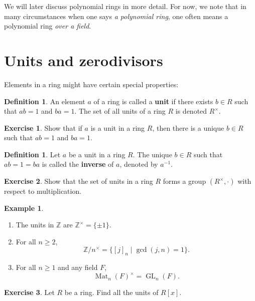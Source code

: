 \documentclass[12pt]{report}
\numberwithin{equation}{section}
\numberwithin{theorem}{chapter}
\theoremstyle{definition}
\newtheorem{definition}[theorem]{Definition}
\newtheorem{example}[theorem]{Example}
\newtheorem{exercise}{Exercise}
\newtheorem*{basic properties}{Basic Properties}
\newtheorem*{Important Remark}{Important Remark}
\newcommand{\df}[1]{{\bf #1}\index{#1}}
\DeclareMathOperator{\GL}{GL}
\DeclareMathOperator{\Mat}{Mat}
\begin{document}
We will later discuss polynomial rings in more detail. For now, we note that in many circumstances when one says \emph{a polynomial ring}, one often means a polynomial ring \emph{over a field}.




\section{Units and zerodivisors}


Elements in a ring might have certain special properties:



\begin{definition}
An element $a$ of a ring is called a \df{unit} if there exists $b\in R$ such that $ab=1$ and $ba=1$. 
The set of all units of a ring $R$ is denoted $R^\times$. 
\end{definition}


\begin{exercise}
	Show that if $a$ is a unit in a ring $R$, then there is a unique $b \in R$ such that $ab=1$ and $ba=1$. 
\end{exercise}


\begin{definition}
	Let $a$ be a unit in a ring $R$. The unique $b \in R$ such that $ab=1=ba$ is called the \df{inverse} of $a$, denoted by $a^{-1}$. 
\end{definition}

\begin{exercise}
	Show that the set of units in a ring $R$ forms a group $(R^\times,\cdot)$ with respect to multiplication.
\end{exercise}


\begin{example}$\,$
\vspace{-0.5em}
\begin{enumerate}[itemsep=-0.1em]
	\item The units in $\mathbb{Z}$ are $\mathbb{Z}^\times = \{\pm 1\}$.
	\item For all $n \geqslant 2$, 
	$$\mathbb{Z}/n^\times = \{[j]_n \mid \gcd(j,n) = 1 \}.$$
	\item For all $n \geqslant 1$ and any field $F$,
$$\Mat_{n}(F)^\times = \GL_n(F).$$
\end{enumerate}
\end{example}


\begin{exercise}
	Let $R$ be a ring. Find all the units of $R[x]$.
\end{exercise}
\end{document}
